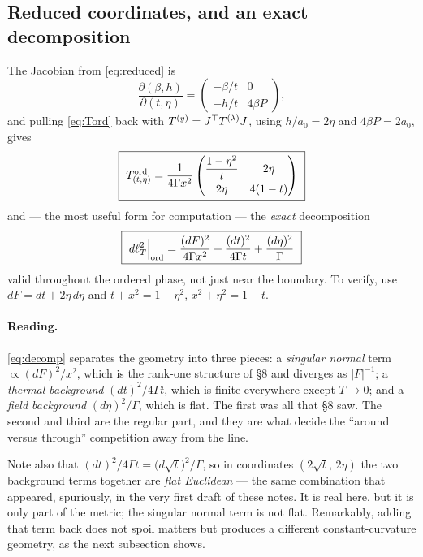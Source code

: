 \subsection{Reduced coordinates, and an exact decomposition}
The Jacobian from \eqref{eq:reduced} is
\begin{equation}
  \frac{\partial(\beta,h)}{\partial(t,\eta)}=
  \begin{pmatrix}-\beta/t & 0\\ -h/t & 4\beta P\end{pmatrix},
\end{equation}
and pulling \eqref{eq:Tord} back with $T^{(y)}=J^{\top}T^{(\lambda)}J$, using
$h/a_0=2\eta$ and $4\beta P=2a_0$, gives
\begin{equation}
  \boxed{\ T^{\rm ord}_{(t,\eta)}=\frac{1}{4\Gamma x^{2}}
  \begin{pmatrix}\dfrac{1-\eta^{2}}{t} & 2\eta\\[6pt] 2\eta & 4(1-t)\end{pmatrix}\ }
  \label{eq:Tred}
\end{equation}
and --- the most useful form for computation --- the \emph{exact} decomposition
\begin{equation}
  \boxed{\ d\ell_T^{2}\Big|_{\rm ord}
   =\frac{(dF)^{2}}{4\Gamma x^{2}}+\frac{(dt)^{2}}{4\Gamma t}+\frac{(d\eta)^{2}}{\Gamma}\ }
  \label{eq:decomp}
\end{equation}
valid throughout the ordered phase, not just near the boundary. To verify, use
$dF=dt+2\eta\,d\eta$ and $t+x^{2}=1-\eta^{2}$, $x^{2}+\eta^{2}=1-t$.

\paragraph{Reading.} \eqref{eq:decomp} separates the geometry into three pieces: a
\emph{singular normal} term $\propto(dF)^{2}/x^{2}$, which is the rank-one structure of \S8
and diverges as $|F|^{-1}$; a \emph{thermal background} $(dt)^{2}/4\Gamma t$, which is finite
everywhere except $T\to0$; and a \emph{field background} $(d\eta)^{2}/\Gamma$, which is flat.
The first was all that \S8 saw. The second and third are the regular part, and they are what
decide the ``around versus through'' competition away from the line.

Note also that $(dt)^{2}/4\Gamma t=\big(d\sqrt t\big)^{2}/\Gamma$, so in coordinates
$(2\sqrt t,\,2\eta)$ the two background terms together are \emph{flat Euclidean} --- the same
combination that appeared, spuriously, in the very first draft of these notes. It is real
here, but it is only part of the metric; the singular normal term is not flat. Remarkably,
adding that term back does not spoil matters but produces a different constant-curvature
geometry, as the next subsection shows.

